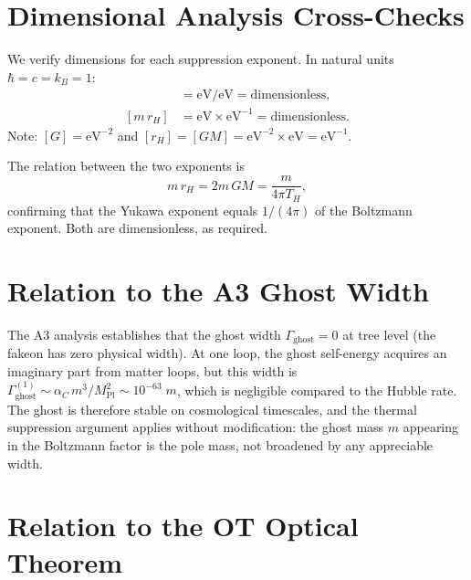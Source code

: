 \documentclass[11pt,a4paper]{article}
\newcommand{\MPl}{M_{\mathrm{Pl}}}
\newcommand{\Thr}{T_{\!\scriptscriptstyle H}}
\theoremstyle{plain}
\theoremstyle{definition}
\begin{document}
\appendix

\section{Dimensional Analysis Cross-Checks}\label{app:dimensions}

We verify dimensions for each suppression exponent.  In natural units
$\hbar = c = k_B = 1$:
\begin{align}
  [m/\Thr] &= \mathrm{eV}/\mathrm{eV} = \text{dimensionless},
  \label{eq:dim1}\\
  [m\,r_H] &= \mathrm{eV}\times\mathrm{eV}^{-1}
  = \text{dimensionless}.\label{eq:dim2}
\end{align}
Note: $[G] = \mathrm{eV}^{-2}$ and
$[r_H] = [GM] = \mathrm{eV}^{-2}\times\mathrm{eV} = \mathrm{eV}^{-1}$.

The relation between the two exponents is
\begin{equation}\label{eq:exponent_relation}
  m\,r_H = 2m\,GM = \frac{m}{4\pi\Thr},
\end{equation}
confirming that the Yukawa exponent equals $1/(4\pi)$ of the
Boltzmann exponent.  Both are dimensionless, as required.


\section{Relation to the A3 Ghost Width}\label{app:a3}

The A3 analysis establishes that the ghost width
$\Gamma_{\mathrm{ghost}} = 0$ at tree level (the fakeon has zero
physical width).  At one loop, the ghost self-energy acquires an
imaginary part from matter loops, but this width is
$\Gamma_{\mathrm{ghost}}^{(1)} \sim \alpha_C\, m^3/\MPl^2
\sim 10^{-63}\;m$, which is negligible compared to the Hubble rate.
The ghost is therefore stable on cosmological timescales, and the
thermal suppression argument applies without modification: the ghost
mass $m$ appearing in the Boltzmann factor is the pole mass, not
broadened by any appreciable width.


\section{Relation to the OT Optical Theorem}\label{app:ot}
\end{document}
